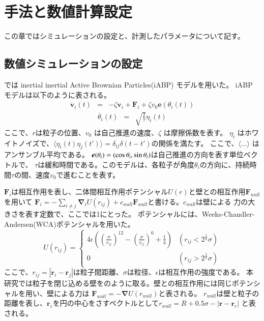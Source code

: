 \documentclass[/Users/ikedahajime/GitHub/reserch/master_report/thesis]{subfiles}
\begin{document}
\chapter{手法と数値計算設定}
この章ではシミュレーションの設定と、計測したパラメータについて記す。
\section{数値シミュレーションの設定}
では inertial inertial Active Brownian Particles(iABP) モデルを用いた。
iABP モデルは以下のように表される。
\begin{eqnarray}
    \dot{\bm{v}_i}(t)&=& - \zeta \bm{v}_i  +\bm{F}_i +\zeta v_0 \bm{e}(\theta_i(t))
\end{eqnarray}
\begin{eqnarray}
    \dot{\theta_i }(t) &=& \sqrt{\frac{2}{\tau}}\eta_i(t)
\end{eqnarray}
ここで、\mbox{\boldmath$r$}は粒子の位置、$v_0$ は自己推進の速度、$\zeta$ は摩擦係数を表す。
$\eta_i$ はホワイトノイズで、$\langle \eta_i(t) \eta_j(t') \rangle=\delta_{ij}\delta(t-t')$の関係を満たす。
ここで、$\langle \dots \rangle$ はアンサンブル平均である。
$\mbox{\boldmath$e$}(\theta_i)=(\cos\theta_i,\sin \theta_i)$は自己推進の方向を表す単位ベクトルで、
$\tau$は緩和時間である。このモデルは、各粒子が角度$\theta_i$の方向に、持続時間$\tau$の間、速度$v_0$で進むことを表す。


$\bm{F}_i$は相互作用を表し、二体間相互作用ポテンシャル$U(r)$と壁との相互作用$\bm{F}_{wall}$を用いて
$\bm{F}_i=-\sum_{i\neq j} \bm{\nabla}_iU(r_{ij})+c_{wall}\bm{F}_{wall}$と書ける。$c_{wall}$は壁による
力の大きさを表す定数で、ここでは1にとった。
ポテンシャルには、Weeks-Chandler-Andersen(WCA)ポテンシャル\cite{weeksRoleRepulsiveForces1971}を用いた。
\begin{equation}
    U(r_{ij})=
    \begin{cases}
        4\epsilon\left(\left(\frac{\sigma}{r_{ij}}\right)^{12}-\left(\frac{\sigma}{r_{ij}}\right)^6+\frac{1}{4}\right) & (r_{ij}<2^{\frac{1}{6}}\sigma)\\
        0 &(r_{ij}>2^{\frac{1}{6}}\sigma)
    \end{cases}
\end{equation}
ここで、$r_{ij}=\left|\bm{r}_i-\bm{r}_j\right|$は粒子間距離、$\sigma$は粒径、$\epsilon$は相互作用の強度である。
本研究では粒子を閉じ込める壁をのように取る。壁との相互作用には同じポテンシャルを用い、壁による力は
$\bm{F}_{wall}=-\bm{\nabla}U(r_{wall})$と表される。
$r_{wall}$は壁と粒子の距離を表し、$\bm{r}_c$を円の中心をさすベクトルとして$r_{wall}=R+0.5\sigma-\left|\bm{r}-\bm{r}_c\right|$
と表される。
\end{document}
